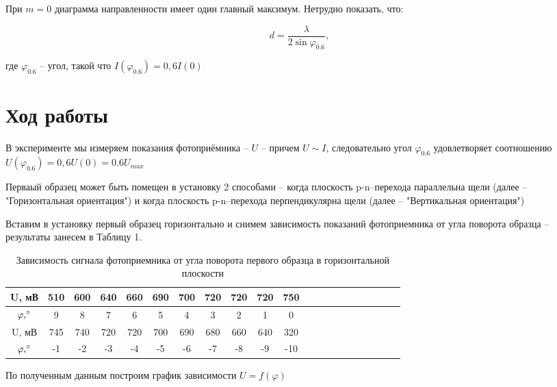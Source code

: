 \documentclass[a4paper,12pt]{article}
\begin{document}
\newpage

При $m=0$ диаграмма направленности имеет один главный максимум. Нетрудно показать, что:

\begin{equation} \label{eq:1}
	d = \frac{\lambda}{2 \sin \varphi_{0.6}},
\end{equation}

где $\varphi_{0.6}$ -- угол, такой что $I(\varphi_{0.6}) = 0,6 I(0)$

\section{Ход работы}

В эксперименте мы измеряем показания фотоприёмника -- $U$ -- причем $U \sim I$, следовательно угол $\varphi_{0.6}$ удовлетворяет соотношению $U(\varphi_{0.6}) = 0,6 U(0) = 0.6 U_{max}$ 

Перваый образец может быть помещен в установку 2 способами -- когда плоскость p-n--перехода параллельна щели (далее -- "Горизонтальная ориентация") и когда плоскость p-n--перехода перпендикулярна щели (далее -- "Вертикальная ориентация")
 
Вставим в установку первый образец горизонтально и снимем зависимость показаний фотоприемника от угла поворота образца -- результаты занесем в Таблицу 1.

\begin{table}[h!]
\centering
\caption{Зависимость сигнала фотоприемника от угла поворота первого образца в горизонтальной плоскости}
\begin{tabular}{|c|c|c|c|c|c|c|c|c|c|c|c|c|c|c|c|c|c|c|c|c|}
\hline
U, мВ & 510 & 600 & 640 & 660 & 690 & 700 & 720 & 720 & 720 & 750 \\ \hline
$\varphi, \degree$    & 9   & 8   & 7   & 6   & 5   & 4   & 3   & 2   & 1   & 0    \\ \hline
U, мВ & 745 & 740 & 720 & 720 & 700 & 690 & 680 & 660 & 640 & 320 \\ \hline
$\varphi, \degree$    & -1  & -2  & -3  & -4  & -5  & -6  & -7  & -8  & -9  & -10 \\ \hline
\end{tabular}
\end{table}

По полученным данным построим график зависимости $U = f(\varphi)$
\end{document}
